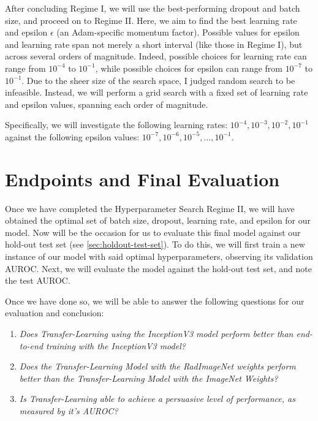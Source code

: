 After concluding Regime I, we will use the best-performing dropout and batch size, and proceed on to Regime II. Here, we aim to find the best learning rate and epsilon \(\epsilon\) (an Adam-specific momentum factor). Possible values for epsilon and learning rate span not merely a short interval (like those in Regime I), but across several orders of magnitude. Indeed, possible choices for learning rate can range from \(10^{-4}\) to \(10^{-1}\), while possible choices for epsilon can range from \(10^{-7}\) to \(10^{-1}\). Due to the sheer size of the search space, I judged random search to be infeasible. Instead, we will perform a grid search with a fixed set of learning rate and epsilon values, spanning each order of magnitude. 

Specifically, we will investigate the following learning rates: \(10^{-4}, 10^{-3}, 10^{-2}, 10^{-1}\) against the following epsilon values: \(10^{-7}, 10^{-6}, 10^{-5}, \ldots, 10^{-1}\).

\section{Endpoints and Final Evaluation}

Once we have completed the Hyperparameter Search Regime II, we will have obtained the optimal set of batch size, dropout, learning rate, and epsilon for our model. Now will be the occasion for us to evaluate this final model against our hold-out test set (see \autoref{sec:holdout-test-set}). To do this, we will first train a new instance of our model with said optimal hyperparameters, observing its validation AUROC. Next, we will evaluate the model against the hold-out test set, and note the test AUROC.

Once we have done so, we will be able to answer the following questions for our evaluation and conclusion:

\begin{enumerate}
    \item \emph{Does Transfer-Learning using the InceptionV3 model perform better than end-to-end training with the InceptionV3 model?}
    \item \emph{Does the Transfer-Learning Model with the RadImageNet weights perform better than the Transfer-Learning Model with the ImageNet Weights?}
    \item \emph{Is Transfer-Learning able to achieve a persuasive level of performance, as measured by it's AUROC?}
\end{enumerate}


